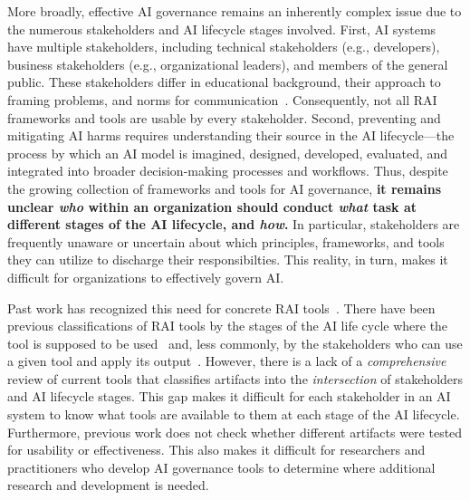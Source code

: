 More broadly, effective AI governance remains an inherently complex issue due to the numerous stakeholders and AI lifecycle stages involved.
First, AI systems have multiple stakeholders, including technical stakeholders (e.g., developers), business stakeholders (e.g., organizational leaders), and members of the general public.
These stakeholders differ in educational background, their approach to framing problems, and norms for communication~\cite{schiff2020principles}. Consequently, not all RAI frameworks and tools are usable by every stakeholder.
Second, preventing and mitigating AI harms requires understanding their source in the AI lifecycle---the process by which an AI model is imagined, designed, developed, evaluated, and integrated into broader decision-making processes and workflows. 
Thus, despite the growing collection of frameworks and tools for AI governance, \textbf{it remains unclear \emph{who} within an organization should conduct \emph{what} task at different stages of the AI lifecycle, and \emph{how}.} In particular, stakeholders are frequently unaware or uncertain about which principles, frameworks, and tools they can utilize to discharge their responsibilties. %
This reality, in turn, makes it difficult for organizations to effectively govern AI. 

Past work has recognized this need for concrete RAI tools~\cite{Morley2019, Prem2023}.
There have been previous classifications of RAI tools by the stages of the AI life cycle where the tool is supposed to be used~\cite{Morley2019, Prem2023, Ayling2022} and, less commonly, by the stakeholders who can use a given tool and apply its output~\cite{Ayling2022}.
However, there is a lack of a \emph{comprehensive} review of current tools that classifies artifacts into the \emph{intersection} of stakeholders and AI lifecycle stages. This gap makes it difficult for each stakeholder in an AI system to know what tools are available to them at each stage of the AI lifecycle.
Furthermore, previous work does not check whether different artifacts were tested for usability or effectiveness.
This also makes it difficult for researchers and practitioners who develop AI governance tools to determine where additional research and development is needed.


